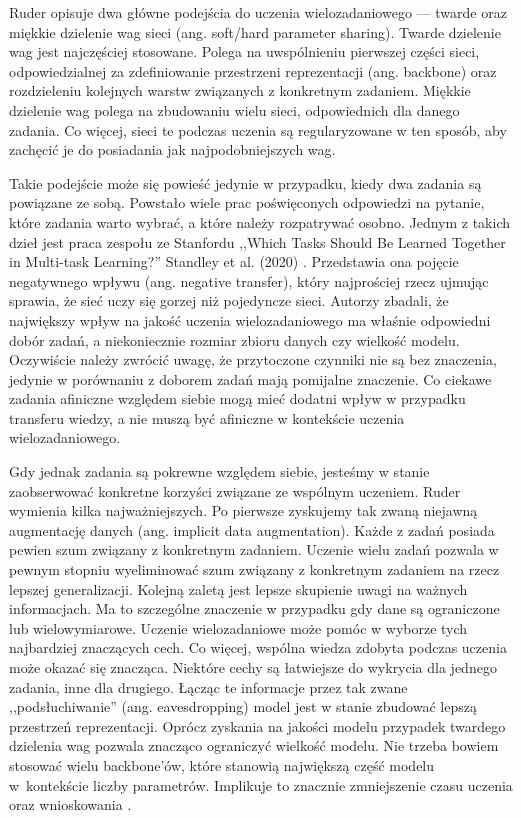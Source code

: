 Ruder opisuje dwa główne podejścia do uczenia wielozadaniowego — twarde oraz miękkie dzielenie wag sieci (ang. soft/hard parameter sharing). Twarde dzielenie wag jest najczęściej stosowane. Polega na uwspólnieniu pierwszej części sieci, odpowiedzialnej za zdefiniowanie przestrzeni reprezentacji (ang. backbone) oraz rozdzieleniu kolejnych warstw związanych z konkretnym zadaniem. Miękkie dzielenie wag polega na zbudowaniu wielu sieci, odpowiednich dla danego zadania. Co więcej, sieci te podczas uczenia są regularyzowane w ten sposób, aby zachęcić je do posiadania jak najpodobniejszych wag.

Takie podejście może się powieść jedynie w przypadku, kiedy dwa zadania są powiązane ze sobą. Powstało wiele prac poświęconych odpowiedzi na pytanie, które zadania warto wybrać, a które należy rozpatrywać osobno. Jednym z takich dzieł jest praca zespołu ze Stanfordu ,,Which Tasks Should Be Learned Together in Multi-task Learning?'' Standley et al. (2020) \cite{standley2020tasks}. Przedstawia ona pojęcie negatywnego wpływu (ang. negative transfer), który najprościej rzecz ujmując sprawia, że sieć uczy się gorzej niż pojedyncze sieci. Autorzy zbadali, że największy wpływ na jakość uczenia wielozadaniowego ma właśnie odpowiedni dobór zadań, a niekoniecznie rozmiar zbioru danych czy wielkość modelu. Oczywiście należy zwrócić uwagę, że przytoczone czynniki nie są bez znaczenia, jedynie w porównaniu z doborem zadań mają pomijalne znaczenie. Co ciekawe zadania afiniczne względem siebie mogą mieć dodatni wpływ w przypadku transferu wiedzy, a nie muszą być afiniczne w kontekście uczenia wielozadaniowego.

Gdy jednak zadania są pokrewne względem siebie, jesteśmy w stanie zaobserwować konkretne korzyści związane ze wspólnym uczeniem. Ruder wymienia kilka najważniejszych. Po pierwsze zyskujemy tak zwaną niejawną augmentację danych (ang. implicit data augmentation). Każde z zadań posiada pewien szum związany z konkretnym zadaniem. Uczenie wielu zadań pozwala w pewnym stopniu wyeliminować szum związany z konkretnym zadaniem na rzecz lepszej generalizacji. Kolejną zaletą jest lepsze skupienie uwagi na ważnych informacjach. Ma to szczególne znaczenie w przypadku gdy dane są ograniczone lub wielowymiarowe. Uczenie wielozadaniowe może pomóc w wyborze tych najbardziej znaczących cech. Co więcej, wspólna wiedza zdobyta podczas uczenia może okazać się znacząca. Niektóre cechy są łatwiejsze do wykrycia dla jednego zadania, inne dla drugiego. Łącząc te informacje przez tak zwane ,,podsłuchiwanie'' (ang. eavesdropping) model jest w stanie zbudować lepszą przestrzeń reprezentacji. Oprócz zyskania na jakości modelu przypadek twardego dzielenia wag pozwala znacząco ograniczyć wielkość modelu. Nie trzeba bowiem stosować wielu backbone'ów, które stanowią największą część modelu w~kontekście liczby parametrów. Implikuje to znacznie zmniejszenie czasu uczenia oraz wnioskowania \cite{standley2020tasks}.